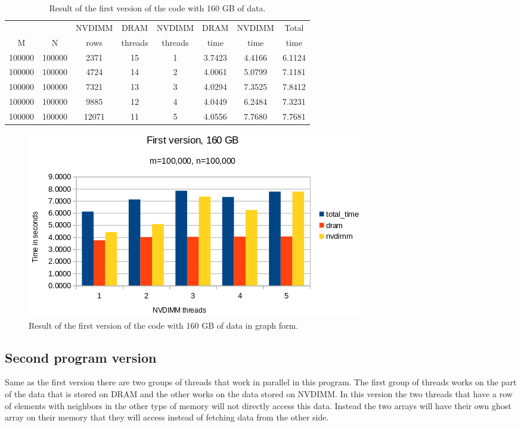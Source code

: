 \documentclass[12pt,a4paper,USenglish]{article}      %
\begin{document}
\begin{table}[!hbtp]
\centering
\begin{tabular}{ |c|c|c|c|c|c|c|c| }
\hline
&  & NVDIMM & DRAM & NVDIMM & DRAM & NVDIMM & Total \\
M & N & rows & threads & threads & time & time & time \\
\hline
100000 & 100000 & 2371 & 15 & 1 & 3.7423 & 4.4166 & 6.1124 \\
\hline
100000 & 100000 & 4724 & 14 & 2 & 4.0061 & 5.0799 & 7.1181 \\
\hline
100000 & 100000 & 7321 & 13 & 3 & 4.0294 & 7.3525 & 7.8412 \\
\hline
100000 & 100000 & 9885 & 12 & 4 & 4.0449 & 6.2484 & 7.3231 \\
\hline
100000 & 100000 & 12071 & 11 & 5 & 4.0556 & 7.7680 & 7.7681 \\
\hline
\end{tabular}
\caption{Result of the first version of the code with 160 GB of data.}
\label{tab:FirstVersion160GB}
\end{table}
\begin{figure}[!hbtp]
\includegraphics[scale=0.7]{Large_Array_test/First_version_160GB.png}
\caption{Result of the first version of the code with 160 GB of data in graph form.}
\label{fig:FirstVersion160GB}
\end{figure}

\clearpage
\subsection{Second program version}
Same as the first version there are two groups of threads that work in parallel in this program. The first group of threads works on the part of the data that is stored on DRAM and the other works on the data stored on NVDIMM.
In this version the two threads that have a row of elements with neighbors in the other type of memory will not directly access this data. Instead the two arrays will have their own ghost array on their memory that they will access instead of fetching data from the other side. 
\end{document}
